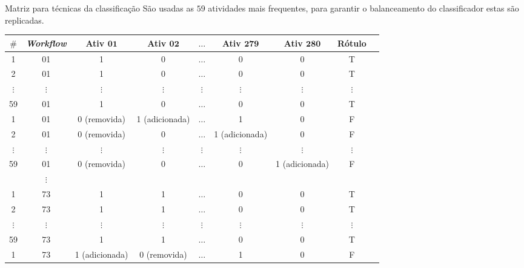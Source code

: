 \begin{frame}		
	\begin{block}{Matriz para técnicas da classificação}
		São usadas as \(59\) atividades mais frequentes, para garantir o balanceamento do classificador estas são replicadas.
		\begin{table}[!htb]
			\tiny
			\centering
			\begin{tabular}{|c|c|c|c|c|c|c|c|c|}  \hline
				\textbf{\(\#\)} & \textbf{\emph{Workflow}} & \textbf{Ativ \(\mathbf{01}\)} & \textbf{Ativ \(\mathbf{02}\)} & \textbf{\(\mathbf{\ldots}\)}  & \textbf{Ativ \(\mathbf{279}\)} & \textbf{Ativ \(\mathbf{280}\)} & \textbf{Rótulo} \\ \hline
				
				1	&		01		 			   & 1 			  & 0 			  & \(\ldots\) 	  & 0 & 0  			& T	\\ \hline
				2	&		01 					   & 1 			  & 0 			  & \(\ldots\) 	  & 0 & 0  			& T	\\ \hline
				\(\vdots\)  &  \(\vdots\) 	   	   & \(\vdots\)   & \(\vdots\) 	  & \(\vdots\) 	  & \(\vdots\) & \(\vdots\) & \(\vdots\)\\ \hline
				59	&		01 					   & 1 			  & 0 			  & \(\ldots\) 	  & 0 & 0   		& T	\\ \hline
				1	&		01		 			   & 0 (removida) 		  & 1 (adicionada) &\(\ldots\)& 1 & 0	& F	\\ \hline
				2	&		01 					   & 0 (removida)& 0 		  & \(\ldots\) 	  & 1 (adicionada) & 0& F	\\ \hline
				\(\vdots\)  &		\(\vdots\) 	   & \(\vdots\) & \(\vdots\) 	  & \(\vdots\) 	  & \(\vdots\) & \(\vdots\) & \(\vdots\) \\ \hline
				59	&		01 					   & 0 (removida)			  & 0 			  & \(\ldots\) & 0 & 1 (adicionada)& F \\ \hline
				&\(\vdots\) & & & & & & 																		\\ \hline
				1	&		73		 			   & 1 			  & 1  & \(\ldots\) 	  & 0 & 0  			& T	\\ \hline
				2	&		73 					   & 1 			  & 1  & \(\ldots\) 	  & 0 & 0  			& T	\\ \hline
				\(\vdots\)  &		\(\vdots\) 	   & \(\vdots\)   & \(\vdots\) 	  & \(\vdots\) 	  & \(\vdots\) & \(\vdots\) & \(\vdots\) \\ \hline
				59	&		73 					   & 1 			  & 1  & \(\ldots\) 	  & 0 & 0   		& T	\\ \hline
				1	&		73		 			   & 1 (adicionada) & 0 (removida)  & \(\ldots\) 	  & 1 & 0   		& F	\\ \hline

\end{tabular}
\end{table}
\end{block}
\end{frame}
